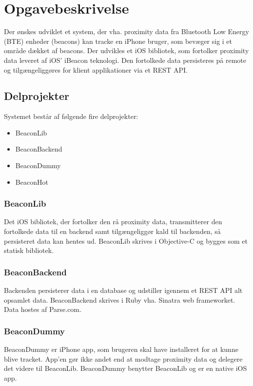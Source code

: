 \chapter{Opgavebeskrivelse}

Der ønskes udviklet et system, der vha. proximity data fra Bluetooth Low Energy (BTE) enheder (beacons) kan tracke en iPhone bruger, som bevæger sig i et område dækket af beacons. Der udvikles et iOS bibliotek, som fortolker proximity data leveret af iOS' iBeacon teknologi. Den fortolkede data persisteres på remote og tilgængeliggøres for klient applikationer via et REST API.

\section{Delprojekter}
Systemet består af følgende fire delprojekter:

\begin{itemize}
	\item BeaconLib
	\item BeaconBackend
	\item BeaconDummy
	\item BeaconHot
\end{itemize}

\subsection{BeaconLib}
Det iOS bibliotek, der fortolker den rå proximity data, transmitterer den fortolkede data til en backend samt tilgængeliggør kald til backenden, så persisteret data kan hentes ud. BeaconLib skrives i Objective-C og bygges som et statisk bibliotek.

\subsection{BeaconBackend}
Backenden persisterer data i en database og udstiller igennem et REST API alt opsamlet data. BeaconBackend skrives i Ruby vha. Sinatra web frameworket. Data hostes af Parse.com.

\subsection{BeaconDummy}
BeaconDummy er iPhone app, som brugeren skal have installeret for at kunne blive tracket. App'en gør ikke andet end at modtage proximity data og delegere det videre til BeaconLib. BeaconDummy benytter BeaconLib og er en native iOS app.

